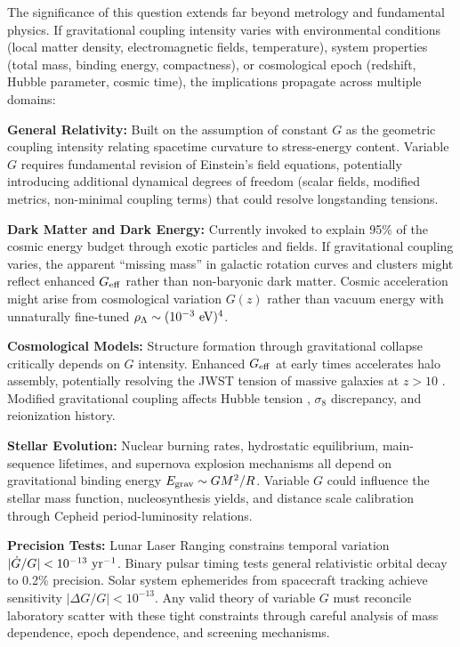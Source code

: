 \documentclass[10pt,a4paper]{article}
\begin{document}
The significance of this question extends far beyond metrology and
fundamental physics. If gravitational coupling intensity varies with
environmental conditions (local matter density, electromagnetic fields,
temperature), system properties (total mass, binding energy,
compactness), or cosmological epoch (redshift, Hubble parameter, cosmic
time), the implications propagate across multiple domains:

\textbf{General Relativity:} Built on the assumption of constant \(G\)
as the geometric coupling intensity relating spacetime curvature to
stress-energy content. Variable \(G\) requires fundamental revision of
Einstein's field equations, potentially introducing additional dynamical
degrees of freedom (scalar fields, modified metrics, non-minimal
coupling terms) that could resolve longstanding tensions.

\textbf{Dark Matter and Dark Energy:} Currently invoked to explain 95\%
of the cosmic energy budget through exotic particles and fields. If
gravitational coupling varies, the apparent ``missing mass'' in galactic
rotation curves and clusters might reflect enhanced \(G_{\rm eff}\)
rather than non-baryonic dark matter. Cosmic acceleration might arise
from cosmological variation \(G(z)\) rather than vacuum energy with
unnaturally fine-tuned \(\rho_\Lambda \sim (10^{-3}~{\rm eV})^4\).

\textbf{Cosmological Models:} Structure formation through gravitational
collapse critically depends on \(G\) intensity. Enhanced \(G_{\rm eff}\)
at early times accelerates halo assembly, potentially resolving the JWST
tension of massive galaxies at \(z > 10\) \cite{Naidu2022,ref30}. Modified gravitational
coupling affects Hubble tension \cite{Riess2022}, \(\sigma_8\) discrepancy, and
reionization history.

\textbf{Stellar Evolution:} Nuclear burning rates, hydrostatic
equilibrium, main-sequence lifetimes, and supernova explosion mechanisms
all depend on gravitational binding energy \(E_{\rm grav} \sim GM^2/R\).
Variable \(G\) could influence the stellar mass function,
nucleosynthesis yields, and distance scale calibration through Cepheid
period-luminosity relations.

\textbf{Precision Tests:} Lunar Laser Ranging constrains temporal
variation \(|\dot{G}/G| < 10^{-13}~{\rm yr^{-1}}\). Binary pulsar timing
tests general relativistic orbital decay to 0.2\% precision. Solar
system ephemerides from spacecraft tracking achieve sensitivity
\(|\Delta G/G| < 10^{-13}\). Any valid theory of variable \(G\) must
reconcile laboratory scatter with these tight constraints through
careful analysis of mass dependence, epoch dependence, and screening
mechanisms.
\end{document}
